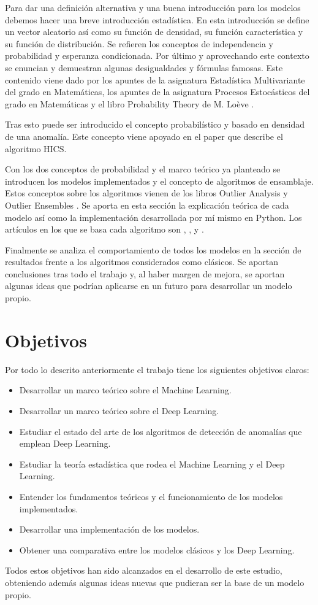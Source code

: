 Para dar una definición alternativa y una buena introducción para los modelos debemos hacer una breve introducción estadística. En esta introducción se define un vector aleatorio así como su función de densidad, su función característica y su función de distribución. Se refieren los conceptos de independencia y probabilidad y esperanza condicionada. Por último y aprovechando este contexto se enuncian y demuestran algunas desigualdades y fórmulas famosas. Este contenido viene dado por los apuntes de la asignatura Estadística Multivariante del grado en Matemáticas, los apuntes de la asignatura Procesos Estocásticos del grado en Matemáticas y el libro Probability Theory de M. Loève \cite{m._loeve_probability_1977}.

Tras esto puede ser introducido el concepto probabilístico y basado en densidad de una anomalía. Este concepto viene apoyado en el paper \cite{fabian_keller_hics:_2012} que describe el algoritmo HICS.

Con los dos conceptos de probabilidad y el marco teórico ya planteado se introducen los modelos implementados y el concepto de algoritmos de ensamblaje. Estos conceptos sobre los algoritmos vienen de los libros Outlier Analysis \cite{aggarwal_outlier_2017-1} y Outlier Ensembles \cite{aggarwal_outlier_2017}. Se aporta en esta sección la explicación teórica de cada modelo así como la implementación desarrollada por mí mismo en Python. Los artículos en los que se basa cada algoritmo son \cite{fabian_keller_hics:_2012}, \cite{aggarwal_outlier_2017}, \cite{pevny_loda:_2016} y \cite{muller_statistical_2011}.

Finalmente se analiza el comportamiento de todos los modelos en la sección de resultados frente a los algoritmos considerados como clásicos. Se aportan conclusiones tras todo el trabajo y, al haber margen de mejora, se aportan algunas ideas que podrían aplicarse en un futuro para desarrollar un modelo propio.

\section{Objetivos}

Por todo lo descrito anteriormente el trabajo tiene los siguientes objetivos claros:

\begin{itemize}
	\item Desarrollar un marco teórico sobre el Machine Learning.
	\item Desarrollar un marco teórico sobre el Deep Learning.
	\item Estudiar el estado del arte de los algoritmos de detección de anomalías que emplean Deep Learning.
	\item Estudiar la teoría estadística que rodea el Machine Learning y el Deep Learning.
	\item Entender los fundamentos teóricos y el funcionamiento de los modelos implementados.
	\item Desarrollar una implementación de los modelos.
	\item Obtener una comparativa entre los modelos clásicos y los Deep Learning.
\end{itemize}

Todos estos objetivos han sido alcanzados en el desarrollo de este estudio, obteniendo además algunas ideas nuevas que pudieran ser la base de un modelo propio.